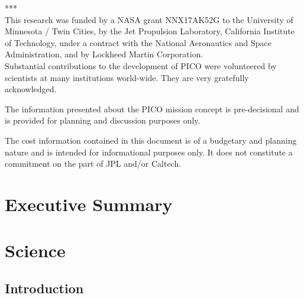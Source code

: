 \documentclass[12pt]{article}
\begin{document}

%
{
\begin{centering}
\small
{***}\\
\smallskip
{This research was funded by a NASA grant NNX17AK52G to the University of Minnesota / Twin Cities, by the Jet Propulsion Laboratory, California Institute of Technology, under a contract with the National Aeronautics and Space Administration, and by Lockheed Martin Corporation. \\ Substantial contributions to the development of PICO were volunteered by scientists at many institutions world-wide.  They are very gratefully acknowledged.} \\
\medskip

{The information presented about the PICO mission concept is pre-decisional and is provided for planning and discussion purposes only.}\\
\medskip

{The cost information contained in this document is of a budgetary and planning nature and is intended for informational purposes only.  It does not constitute a commitment on the part of JPL and/or Caltech.}\\

\end{centering}
}
\newpage
{
\hypersetup{linkcolor=black}
\tableofcontents
}
\newpage
{}
\setcounter{page}{1}
\setcounter{figure}{0}


\section{Executive Summary} %


\section{Science}
\label{sec:science}

\subsection{Introduction} %


\end{document}
